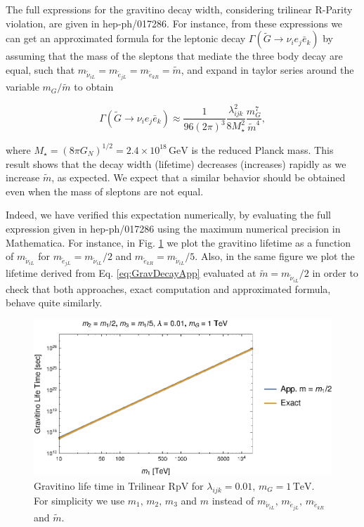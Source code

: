 \documentclass[a4paper,11pt]{article}
\begin{document}
The full expressions for the gravitino decay width, considering trilinear
R-Parity violation, are given in hep-ph/017286. For instance, from
these expressions we can get an approximated formula for the leptonic
decay $\Gamma(\tilde{G}\rightarrow\nu_{i}e_{j}\bar{e}_{k})$ by assuming
that the mass of the sleptons that mediate the three body decay are
equal, such that $m_{\tilde{\nu}_{iL}}=m_{\tilde{e}_{jL}}=m_{\tilde{e}_{kR}}=\tilde{m}$,
and expand in taylor series around the variable $m_{G}/\tilde{m}$
to obtain

\begin{equation}
\Gamma(\tilde{G}\rightarrow\nu_{i}e_{j}\bar{e}_{k})\approx\frac{1}{96(2\pi)^{3}}\frac{\lambda_{ijk}^{2}}{8M_{\star}^{2}}\frac{m_{G}^{7}}{\tilde{m}^{4}},\label{eq:GravDecayApp}
\end{equation}


\noindent where $M_{\star}=(8\pi G_{N})^{1/2}=2.4\times10^{18}\,\mbox{GeV}$
is the reduced Planck mass. This result shows that the decay width
(lifetime) decreases (increases) rapidly as we increase $\tilde{m}$,
as expected. We expect that a similar behavior should be obtained
even when the mass of sleptons are not equal.

Indeed, we have verified this expectation numerically, by evaluating
the full expression given in hep-ph/017286 using the maximum numerical
precision in Mathematica. For instance, in Fig. \ref{fig:Gravitino-life-time}
we plot the gravitino lifetime as a function of $m_{\tilde{\nu}_{iL}}$
for $m_{\tilde{e}_{jL}}=m_{\tilde{\nu}_{iL}}/2$ and $m_{\tilde{e}_{kR}}=m_{\tilde{\nu}_{iL}}/5$.
Also, in the same figure we plot the lifetime derived from Eq. \ref{eq:GravDecayApp}
evaluated at $\tilde{m}=m_{\tilde{\nu}_{iL}}/2$ in order to check
that both approaches, exact computation and approximated formula,
behave quite similarly.

\begin{figure}
\begin{centering}
\includegraphics[scale=1.2]{GravitinoDecaym1m2m3Final}
\par\end{centering}

\caption{\label{fig:Gravitino-life-time}Gravitino life time in Trilinear RpV
for $\lambda_{ijk}=0.01,\,m_{G}=1\,\mbox{TeV}$. For simplicity we
use $m_{1},\,m_{2},\,m_{3}$ and $m$ instead of $m_{\tilde{\nu}_{iL}},\,m_{\tilde{e}_{jL}},\,m_{\tilde{e}_{kR}}$
and $\tilde{m}$.}
\end{figure}
\end{document}
